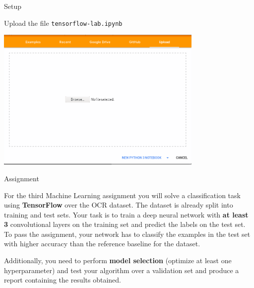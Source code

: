 \documentclass[10pt]{beamer}
\begin{document}
\begin{frame}{Setup}
\centering

Upload the file \texttt{tensorflow-lab.ipynb} \\
\vspace{0.2in}

\includegraphics[width=0.75\textwidth]{figures/upload}

\end{frame}




\begin{frame}{Assignment}
\centering

For the third Machine Learning assignment you will solve a classification task
using \textbf{TensorFlow} over the OCR dataset. The dataset is already split
into training and test sets. Your task is to train a deep
neural network with {\bf at least 3} convolutional layers on the training set and predict the labels on the test set. To
pass the assignment, your network has to classify the examples in the test
set with higher accuracy than the reference baseline for the dataset.

		Additionally, you need to perform \textbf{model selection}  
		(optimize at least one hyperparameter) and 
test your algorithm over a validation set
and produce a report containing the results obtained.


\end{frame}

\end{document}
